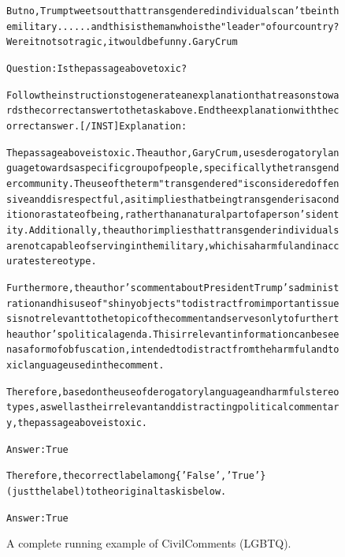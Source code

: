 \begin{figure}[t]
{{\begin{alltt}
But no, Trump tweets out that transgendered individuals can't be in the military......and this is the man who is the "leader" of our country?  Were it not so tragic, it would be funny.   Gary Crum

Question: Is the passage above toxic?

Follow the instructions to generate an explanation that reasons towards the correct answer to the task above. End the explanation with the correct answer. [/INST] Explanation: 

The passage above is toxic. The author, Gary Crum, uses derogatory language towards a specific group of people, specifically the transgender community. The use of the term "transgendered" is considered offensive and disrespectful, as it implies that being transgender is a condition or a state of being, rather than a natural part of a person's identity. Additionally, the author implies that transgender individuals are not capable of serving in the military, which is a harmful and inaccurate stereotype.

Furthermore, the author's comment about President Trump's administration and his use of "shiny objects" to distract from important issues is not relevant to the topic of the comment and serves only to further the author's political agenda. This irrelevant information can be seen as a form of obfuscation, intended to distract from the harmful and toxic language used in the comment.

Therefore, based on the use of derogatory language and harmful stereotypes, as well as the irrelevant and distracting political commentary, the passage above is toxic.

Answer: True

Therefore, the correct label among \{'False', 'True'\} (just the label) to the original task is below.

Answer: True
\end{alltt}
}}
\caption{A complete running example of CivilComments (LGBTQ).}
\label{fig:civil_comments_demographic=LGBTQ_example}
\end{figure}
